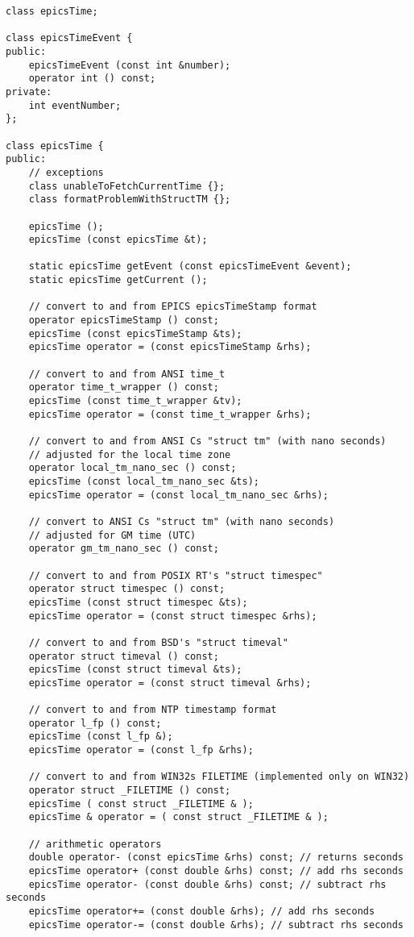 \begin{verbatim}class epicsTime;

class epicsTimeEvent {
public:
    epicsTimeEvent (const int &number);
    operator int () const;
private:
    int eventNumber;
};

class epicsTime {
public:
    // exceptions
    class unableToFetchCurrentTime {};
    class formatProblemWithStructTM {};

    epicsTime ();
    epicsTime (const epicsTime &t);

    static epicsTime getEvent (const epicsTimeEvent &event);
    static epicsTime getCurrent ();

    // convert to and from EPICS epicsTimeStamp format
    operator epicsTimeStamp () const;
    epicsTime (const epicsTimeStamp &ts);
    epicsTime operator = (const epicsTimeStamp &rhs);

    // convert to and from ANSI time_t 
    operator time_t_wrapper () const;
    epicsTime (const time_t_wrapper &tv);
    epicsTime operator = (const time_t_wrapper &rhs);

    // convert to and from ANSI Cs "struct tm" (with nano seconds)
    // adjusted for the local time zone
    operator local_tm_nano_sec () const;
    epicsTime (const local_tm_nano_sec &ts);
    epicsTime operator = (const local_tm_nano_sec &rhs);

    // convert to ANSI Cs "struct tm" (with nano seconds)
    // adjusted for GM time (UTC)
    operator gm_tm_nano_sec () const;

    // convert to and from POSIX RT's "struct timespec"
    operator struct timespec () const;
    epicsTime (const struct timespec &ts);
    epicsTime operator = (const struct timespec &rhs);

    // convert to and from BSD's "struct timeval"
    operator struct timeval () const;
    epicsTime (const struct timeval &ts);
    epicsTime operator = (const struct timeval &rhs);

    // convert to and from NTP timestamp format
    operator l_fp () const;
    epicsTime (const l_fp &);
    epicsTime operator = (const l_fp &rhs);

    // convert to and from WIN32s FILETIME (implemented only on WIN32)
    operator struct _FILETIME () const;
    epicsTime ( const struct _FILETIME & );
    epicsTime & operator = ( const struct _FILETIME & );

    // arithmetic operators
    double operator- (const epicsTime &rhs) const; // returns seconds
    epicsTime operator+ (const double &rhs) const; // add rhs seconds
    epicsTime operator- (const double &rhs) const; // subtract rhs seconds
    epicsTime operator+= (const double &rhs); // add rhs seconds
    epicsTime operator-= (const double &rhs); // subtract rhs seconds


\end{verbatim}
